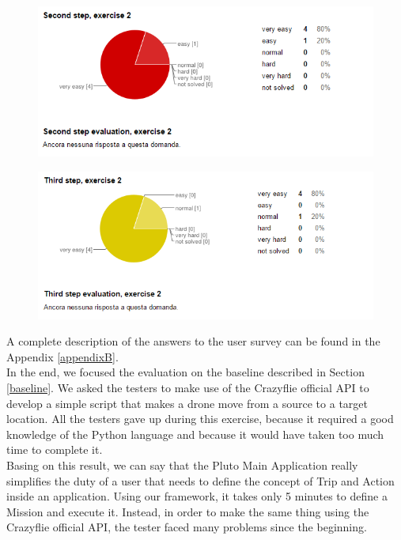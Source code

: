  \begin{figure}[h!]
   \centering
   \includegraphics[width=\linewidth]{pictures/survey9.png}
   \label{fig:survey9}
 \end{figure}
 
\begin{figure}[h!]
   \centering
   \includegraphics[width=\linewidth]{pictures/survey10.png}
   \label{fig:survey10}
 \end{figure}
 
A complete description of the answers to the user survey can be found in the Appendix \ref{appendixB}.
\\

In the end, we focused the evaluation on the baseline described in Section \ref{baseline}.
We asked the testers to make use of the Crazyflie official API to develop a simple script that makes a drone move from a source to a target location.
All the testers gave up during this exercise, because it required a good knowledge of the Python language and because it would have taken too much time to complete it.
\\
Basing on this result, we can say that the Pluto Main Application really simplifies the duty of a user that needs to define the concept of Trip and Action inside an application.
Using our framework, it takes only 5 minutes to define a Mission and execute it.
Instead, in order to make the same thing using the Crazyflie official API, the tester faced many problems since the beginning.
\\

